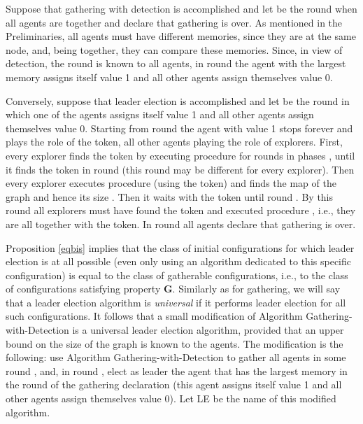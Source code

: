 \documentclass[11pt]{article}
\newcommand{\qed}{\hfill  \bigbreak}
\newenvironment{proof}{\noindent {\bf Proof.}}{\qed}
\begin{document}
\begin{proof}
Suppose that gathering with detection is accomplished and let  be the round when all agents
are together and declare that gathering is over. As mentioned in the Preliminaries, all agents must have different
memories, since they are at the same node, and, being together, they can compare these memories. 
Since,  in view of detection, the round  is known to all agents,
in round  the agent with 
the largest memory assigns itself value 1 and all other agents assign themselves value 0.

Conversely, suppose that leader election is accomplished and let  be the round in which one 
of the agents assigns itself value 1 and all other agents assign themselves value 0. Starting from round 
the agent with value 1 stops forever and plays the role of the token, all other agents playing the role of explorers.
First, every explorer finds the token by executing procedure  for  rounds in phases 
, until it finds the token in round  (this round may be different for every explorer). 
Then every explorer executes procedure  (using the token) and finds the map of the graph and hence its size .
Then it waits with the token until round . By this round
all explorers must have found the token and executed procedure , i.e., they are all together with the token.
In round  all agents declare that gathering is over. 
\end{proof}

Proposition \ref{eqbis} implies that the class of initial configurations for which leader election is at all possible (even only using an algorithm dedicated
to this specific configuration) is equal to the class of gatherable configurations, i.e., to the class of configurations
satisfying property {\bf G}. Similarly as for gathering, we will say that a leader election algorithm is {\em universal} if it performs leader election for all
such configurations. It follows that a small modification of Algorithm Gathering-with-Detection is a universal leader election algorithm,
provided that an upper bound on the size of the graph is known to the agents. The modification is 
the following: use Algorithm Gathering-with-Detection to gather all agents in some round , and, in round , elect as leader the agent that has the largest 
memory in the round of the gathering declaration (this agent assigns itself value 1 and all other agents assign themselves value 0). Let LE be the name of this modified algorithm.
\end{document}
